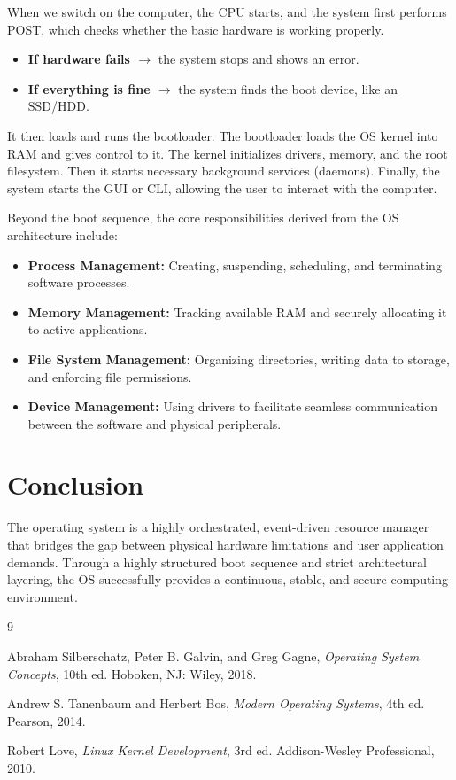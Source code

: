 \documentclass[11pt, a4paper]{article}
\begin{document}
When we switch on the computer, the CPU starts, and the system first performs POST, which checks whether the basic hardware is working properly.
\begin{itemize}
    \item \textbf{If hardware fails $\rightarrow$} the system stops and shows an error.
    \item \textbf{If everything is fine $\rightarrow$} the system finds the boot device, like an SSD/HDD.
\end{itemize}
It then loads and runs the bootloader. The bootloader loads the OS kernel into RAM and gives control to it. The kernel initializes drivers, memory, and the root filesystem. Then it starts necessary background services (daemons). Finally, the system starts the GUI or CLI, allowing the user to interact with the computer.

Beyond the boot sequence, the core responsibilities derived from the OS architecture include:
\begin{itemize}
    \item \textbf{Process Management:} Creating, suspending, scheduling, and terminating software processes.
    \item \textbf{Memory Management:} Tracking available RAM and securely allocating it to active applications.
    \item \textbf{File System Management:} Organizing directories, writing data to storage, and enforcing file permissions.
    \item \textbf{Device Management:} Using drivers to facilitate seamless communication between the software and physical peripherals.
\end{itemize}

\section{Conclusion}
The operating system is a highly orchestrated, event-driven resource manager that bridges the gap between physical hardware limitations and user application demands. Through a highly structured boot sequence and strict architectural layering, the OS successfully provides a continuous, stable, and secure computing environment.

\begin{thebibliography}{9}

Abraham Silberschatz, Peter B. Galvin, and Greg Gagne, 
\textit{Operating System Concepts}, 10th ed. Hoboken, NJ: Wiley, 2018.

Andrew S. Tanenbaum and Herbert Bos, 
\textit{Modern Operating Systems}, 4th ed. Pearson, 2014.

Robert Love, 
\textit{Linux Kernel Development}, 3rd ed. Addison-Wesley Professional, 2010.

\end{thebibliography}
\end{document}
